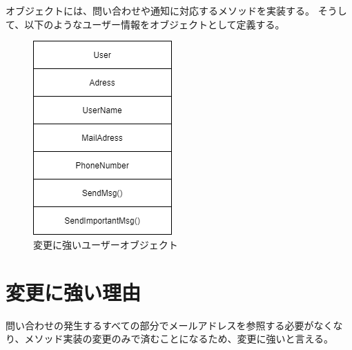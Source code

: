 \documentclass[a4paper,10pt]{jsarticle}
\begin{document}
オブジェクトには、問い合わせや通知に対応するメソッドを実装する。
そうして、以下のようなユーザー情報をオブジェクトとして定義する。
\begin{figure}[H]
  \centering
  \includegraphics[width=\linewidth]{./02.drawio.png}
  \caption{変更に強いユーザーオブジェクト}
  \label{}
\end{figure}

\section{変更に強い理由}
問い合わせの発生するすべての部分でメールアドレスを参照する必要がなくなり、メソッド実装の変更のみで済むことになるため、変更に強いと言える。
\end{document}
